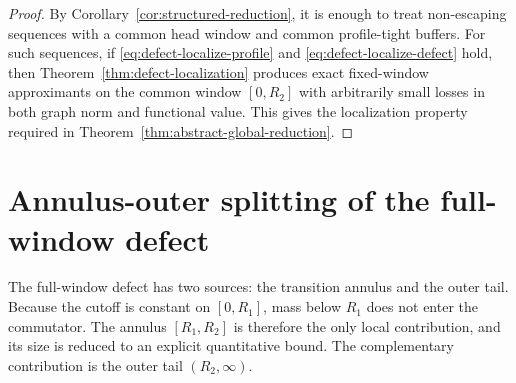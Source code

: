 \documentclass[11pt,a4paper]{amsart}
\theoremstyle{plain}
\theoremstyle{definition}
\theoremstyle{remark}
\begin{document}
\begin{proof}
By Corollary~\ref{cor:structured-reduction}, it is enough to treat non-escaping sequences with a
common head window and common profile-tight buffers. For such sequences, if
\eqref{eq:defect-localize-profile} and \eqref{eq:defect-localize-defect} hold, then
Theorem~\ref{thm:defect-localization} produces exact fixed-window approximants on the common window
\([0,R_2]\) with arbitrarily small losses in both graph norm and functional value. This gives
the localization property required in Theorem~\ref{thm:abstract-global-reduction}.
\end{proof}

\section{Annulus-outer splitting of the full-window defect}
\label{sec:defect-splitting}

The full-window defect has two sources: the transition annulus and the outer tail.  Because the
cutoff is constant on \([0,R_1]\), mass below \(R_1\) does not enter the commutator.  The annulus
\([R_1,R_2]\) is therefore the only local contribution, and its size is reduced to an explicit
quantitative bound.  The complementary contribution is the outer tail \((R_2,\infty)\).
\end{document}

